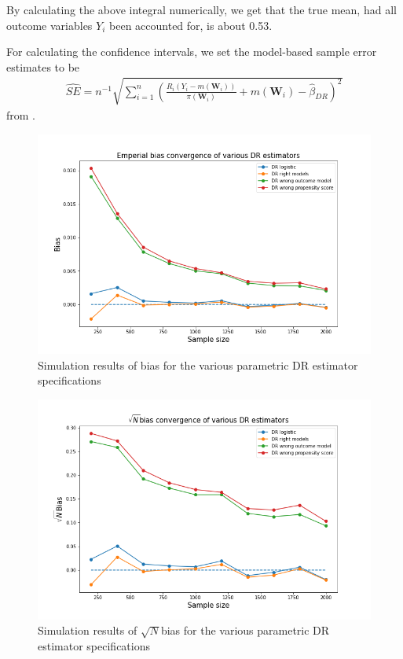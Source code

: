 \documentclass[12pt,twoside]{article}
\begin{document}
By calculating the above integral numerically, we get that the true mean, had all outcome variables $Y_i$ been accounted for, is about 0.53.

For calculating the confidence intervals, we set the model-based sample error estimates to be 
\begin{align*}
    \hat{SE} = n^{-1} \sqrt{\sum_{i=1}^n \left(\frac{R_i(Y_i - m(\mathbf{W}_i))}{\pi(\mathbf{W}_i)} + m(\mathbf{W}_i) - \hat{\beta}_{DR}\right)^2}
\end{align*}
from \citet{lunceford_davidian}. \\

\begin{figure}[h!]
    \centering
    \includegraphics[width = 0.9\columnwidth]{figures/biaspara.png}
    \caption{Simulation results of bias for the various parametric DR estimator specifications}
    \label{figbiaspara}
\end{figure}

\begin{figure}[h!]
    \centering
    \includegraphics[width = 0.9\columnwidth]{figures/sqrtnpara.png}
    \caption{Simulation results of $\sqrt{N}$bias for the various parametric DR estimator specifications}
    \label{figsqrtnpara}
\end{figure}
\end{document}
